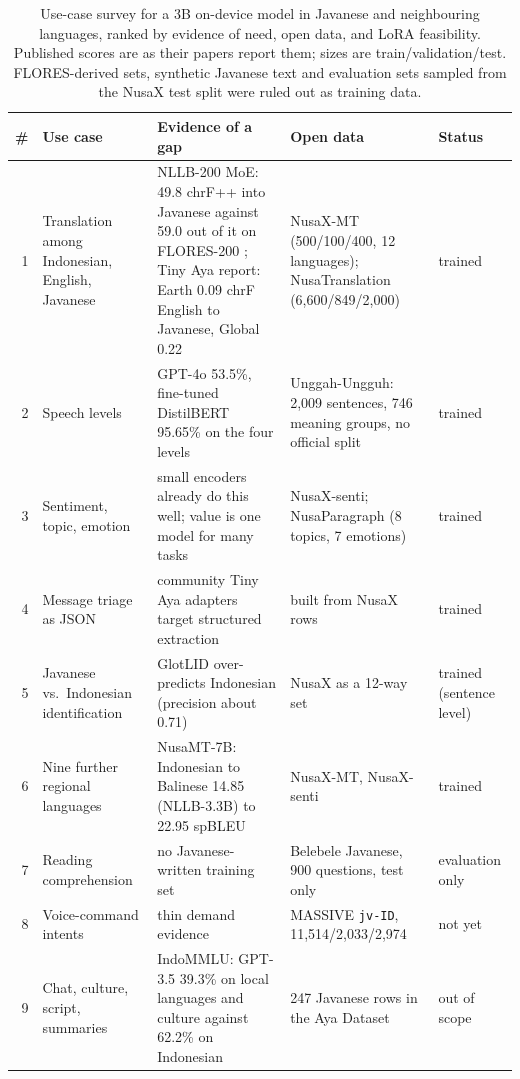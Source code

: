 \documentclass[11pt]{article}
\begin{document}
\begin{table}[t]
\centering\small
\setlength{\tabcolsep}{3pt}
\begin{tabular}{rL{3.0cm}L{5.2cm}L{4.2cm}L{1.7cm}}
\toprule
\# & Use case & Evidence of a gap & Open data & Status \\
 & Translation among Indonesian, English, Javanese & NLLB-200 MoE: 49.8 chrF++ into Javanese against 59.0 out
of it on FLORES-200 \citep{nllb2022}; Tiny Aya report: Earth 0.09 chrF English to Javanese, Global 0.22
\citep{salamanca2026tinyaya} & NusaX-MT (500/100/400, 12 languages); NusaTranslation (6,600/849/2,000) & trained \\
2 & Speech levels & GPT-4o 53.5\%, fine-tuned DistilBERT 95.65\% on the four levels \citep{farhansyah2025unggah} &
Unggah-Ungguh: 2,009 sentences, 746 meaning groups, no official split & trained \\
3 & Sentiment, topic, emotion & small encoders already do this well; value is one model for many tasks & NusaX-senti;
NusaParagraph (8 topics, 7 emotions) & trained \\
4 & Message triage as JSON & community Tiny Aya adapters target structured extraction & built from NusaX rows &
trained \\
5 & Javanese vs.\ Indonesian identification & GlotLID over-predicts Indonesian (precision about 0.71)
\citep{kargaran2023glotlid} & NusaX as a 12-way set & trained (sentence level) \\
6 & Nine further regional languages & NusaMT-7B: Indonesian to Balinese 14.85 (NLLB-3.3B) to 22.95 spBLEU
\citep{tan2024nusamt} & NusaX-MT, NusaX-senti & trained \\
7 & Reading comprehension & no Javanese-written training set & Belebele Javanese, 900 questions, test only
\citep{bandarkar2024belebele} & evaluation only \\
8 & Voice-command intents & thin demand evidence & MASSIVE \texttt{jv-ID}, 11,514/2,033/2,974
\citep{fitzgerald2022massive} & not yet \\
9 & Chat, culture, script, summaries & IndoMMLU: GPT-3.5 39.3\% on local languages and culture against 62.2\% on
Indonesian \citep{koto2023indommlu} & 247 Javanese rows in the Aya Dataset \citep{singh2024ayadataset} & out of
scope \\
\bottomrule
\end{tabular}
\caption{Use-case survey for a 3B on-device model in Javanese and neighbouring languages, ranked by evidence of
need, open data, and LoRA feasibility. Published scores are as their papers report them; sizes are
train/validation/test. FLORES-derived sets, synthetic Javanese text and evaluation sets sampled from the
NusaX test split were ruled out as training data.}
\label{tab:survey}
\end{table}
\end{document}
